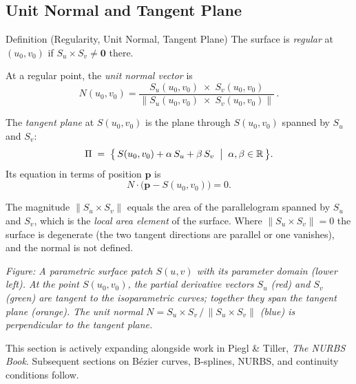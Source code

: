 \subsection*{Unit Normal and Tangent Plane}

\begin{propositionbox}{Definition (Regularity, Unit Normal, Tangent Plane)}
The surface is \emph{regular} at $(u_0,v_0)$ if
$S_u \times S_v \neq \mathbf{0}$ there.

At a regular point, the \emph{unit normal vector} is
\[
  N(u_0,v_0)
  = \frac{S_u(u_0,v_0)\;\times\; S_v(u_0,v_0)}
         {\|S_u(u_0,v_0)\;\times\; S_v(u_0,v_0)\|}\,.
\]

The \emph{tangent plane} at $S(u_0,v_0)$ is the plane through
$S(u_0,v_0)$ spanned by $S_u$ and $S_v$:
\[
  \Pi\;=\;\bigl\{\,S(u_0,v_0) + \alpha\,S_u + \beta\,S_v
               \;\bigm|\; \alpha,\beta\in\mathbb{R}\,\bigr\}.
\]
Its equation in terms of position $\mathbf{p}$ is
\[
  N\cdot\bigl(\mathbf{p} - S(u_0,v_0)\bigr) = 0.
\]
\end{propositionbox}

\begin{remark*}
The magnitude $\|S_u \times S_v\|$ equals the area of the
parallelogram spanned by $S_u$ and $S_v$, which is the
\emph{local area element} of the surface.
Where $\|S_u \times S_v\| = 0$ the surface is degenerate
(the two tangent directions are parallel or one vanishes),
and the normal is not defined.
\end{remark*}

\vspace{1em}
\begin{center}

\end{center}

\begin{center}
\small\itshape
Figure: A parametric surface patch $S(u,v)$ with its parameter domain (lower left).
At the point $S(u_0,v_0)$, the partial derivative vectors $S_u$ (red) and $S_v$ (green)
are tangent to the isoparametric curves; together they span the tangent plane (orange).
The unit normal $N = S_u \times S_v\,/\,\|S_u \times S_v\|$ (blue) is perpendicular
to the tangent plane.
\end{center}

\vspace{1em}
\begin{tcolorbox}[
  colback=gray!6, colframe=gray!40, arc=2pt,
  left=8pt, right=8pt, top=6pt, bottom=6pt,
  title={\small\textbf{Status: Active}},
  fonttitle=\small\bfseries
]
\noindent This section is actively expanding alongside work in Piegl \& Tiller,
\textit{The NURBS Book}.
Subsequent sections on Bézier curves, B-splines, NURBS, and continuity
conditions follow.
\end{tcolorbox}
